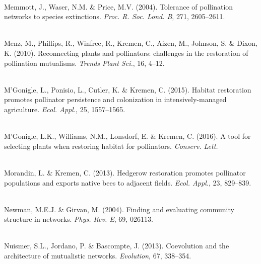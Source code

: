 \documentclass[12pt]{article}
\begin{document}
\begin{thebibliography}{67}
\hspace{0em}\\Memmott, J., Waser, N.M. \& Price, M.V. (2004).
\newblock Tolerance of pollination networks to species extinctions.
\newblock \emph{Proc. R. Soc. Lond. B}, 271, 2605--2611.

\hspace{0em}\\Menz, M., Phillips, R., Winfree, R., Kremen, C., Aizen, M.,
  Johnson, S. \& Dixon, K. (2010).
\newblock Reconnecting plants and pollinators: challenges in the restoration of
  pollination mutualisms.
\newblock \emph{Trends Plant Sci.}, 16, 4--12.

\hspace{0em}\\M'Gonigle, L., Ponisio, L., Cutler, K. \& Kremen, C. (2015).
\newblock Habitat restoration promotes pollinator persistence and colonization
  in intensively-managed agriculture.
\newblock \emph{Ecol. Appl.}, 25, 1557--1565.

\hspace{0em}\\M'Gonigle, L.K., Williams, N.M., Lonsdorf, E. \& Kremen, C.
  (2016).
\newblock A tool for selecting plants when restoring habitat for pollinators.
\newblock \emph{Conserv. Lett.}

\hspace{0em}\\Morandin, L. \& Kremen, C. (2013).
\newblock Hedgerow restoration promotes pollinator populations and exports
  native bees to adjacent fields.
\newblock \emph{Ecol. Appl.}, 23, 829--839.

\hspace{0em}\\Newman, M.E.J. \& Girvan, M. (2004).
\newblock Finding and evaluating community structure in networks.
\newblock \emph{Phys. Rev. E}, 69, 026113.

\hspace{0em}\\Nuismer, S.L., Jordano, P. \& Bascompte, J. (2013).
\newblock Coevolution and the architecture of mutualistic networks.
\newblock \emph{Evolution}, 67, 338--354.


\end{thebibliography}
\end{document}
